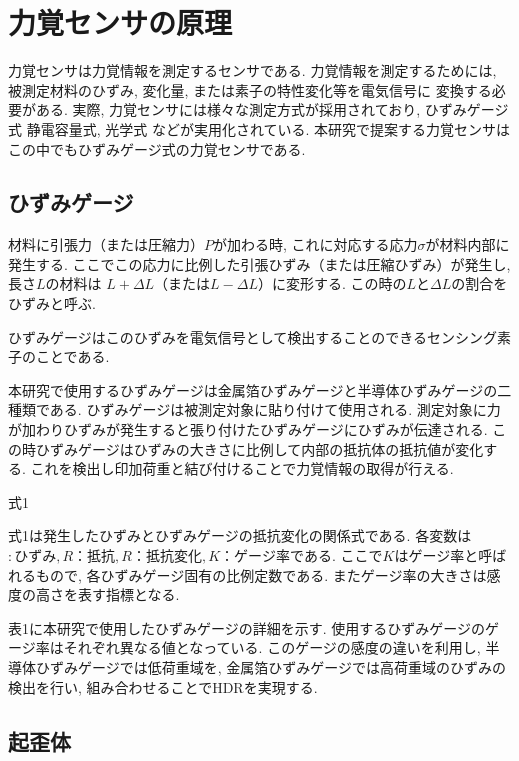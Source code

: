 \section{力覚センサの原理}
力覚センサは力覚情報を測定するセンサである. 
力覚情報を測定するためには, 被測定材料のひずみ, 変化量, または素子の特性変化等を電気信号に
変換する必要がある. 
実際, 力覚センサには様々な測定方式が採用されており, 
ひずみゲージ式\cite{yoshikawa1989six}%
静電容量式\cite{Beyeler2009}, 
光学式\cite{Kim2013a}%
などが実用化されている.
本研究で提案する力覚センサはこの中でもひずみゲージ式の力覚センサである. 

\subsection{ひずみゲージ}
材料に引張力（または圧縮力）$P$が加わる時, これに対応する応力$σ$が材料内部に発生する.
ここでこの応力に比例した引張ひずみ（または圧縮ひずみ）が発生し, 長さ$L$の材料は
$L + \Delta L$（または$L - \Delta L$）に変形する. 
この時の$L$と$\Delta L$の割合をひずみと呼ぶ. 

ひずみゲージはこのひずみを電気信号として検出することのできるセンシング素子のことである. 

本研究で使用するひずみゲージは金属箔ひずみゲージと半導体ひずみゲージの二種類である. 
ひずみゲージは被測定対象に貼り付けて使用される. 
測定対象に力が加わりひずみが発生すると張り付けたひずみゲージにひずみが伝達される. 
この時ひずみゲージはひずみの大きさに比例して内部の抵抗体の抵抗値が変化する. 
これを検出し印加荷重と結び付けることで力覚情報の取得が行える. 

式1

式1は発生したひずみとひずみゲージの抵抗変化の関係式である. 
各変数は $:ひずみ, R：抵抗, R：抵抗変化, K：ゲージ率$である. 
ここで$K$はゲージ率と呼ばれるもので, 各ひずみゲージ固有の比例定数である. 
またゲージ率の大きさは感度の高さを表す指標となる. 

表1に本研究で使用したひずみゲージの詳細を示す. 
使用するひずみゲージのゲージ率はそれぞれ異なる値となっている. 
このゲージの感度の違いを利用し, 半導体ひずみゲージでは低荷重域を, 
金属箔ひずみゲージでは高荷重域のひずみの検出を行い, 
組み合わせることでHDRを実現する. 

\subsection{起歪体}


